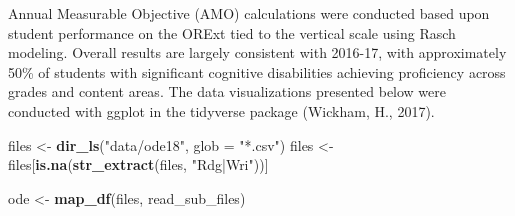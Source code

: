 \documentclass[]{article}
\newenvironment{Shaded}{\begin{snugshade}}{\end{snugshade}}
\newcommand{\DataTypeTok}[1]{\textcolor[rgb]{0.13,0.29,0.53}{#1}}
\newcommand{\KeywordTok}[1]{\textcolor[rgb]{0.13,0.29,0.53}{\textbf{#1}}}
\newcommand{\NormalTok}[1]{#1}
\newcommand{\StringTok}[1]{\textcolor[rgb]{0.31,0.60,0.02}{#1}}
\begin{document}
Annual Measurable Objective (AMO) calculations were conducted based upon
student performance on the ORExt tied to the vertical scale using Rasch
modeling. Overall results are largely consistent with 2016-17, with
approximately 50\% of students with significant cognitive disabilities
achieving proficiency across grades and content areas. The data
visualizations presented below were conducted with ggplot in the
tidyverse package (Wickham, H., 2017).

\begin{Shaded}
\begin{Highlighting}[]
\NormalTok{files <-}\StringTok{ }\KeywordTok{dir_ls}\NormalTok{(}\StringTok{"data/ode18"}\NormalTok{, }\DataTypeTok{glob =} \StringTok{"*.csv"}\NormalTok{)}
\NormalTok{files <-}\StringTok{ }\NormalTok{files[}\KeywordTok{is.na}\NormalTok{(}\KeywordTok{str_extract}\NormalTok{(files, }\StringTok{"Rdg|Wri"}\NormalTok{))]}

\NormalTok{ode <-}\StringTok{ }\KeywordTok{map_df}\NormalTok{(files, read_sub_files)}


\end{Highlighting}
\end{Shaded}
\end{document}

